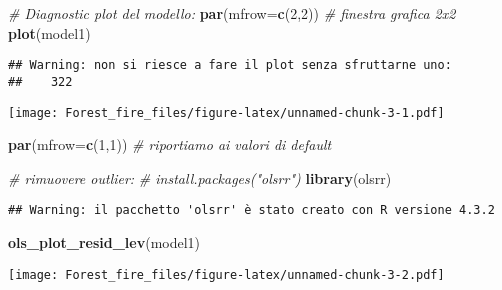 \documentclass[
]{article}
\newenvironment{Shaded}{\begin{snugshade}}{\end{snugshade}}
\newcommand{\AttributeTok}[1]{\textcolor[rgb]{0.13,0.29,0.53}{#1}}
\newcommand{\CommentTok}[1]{\textcolor[rgb]{0.56,0.35,0.01}{\textit{#1}}}
\newcommand{\DecValTok}[1]{\textcolor[rgb]{0.00,0.00,0.81}{#1}}
\newcommand{\FunctionTok}[1]{\textcolor[rgb]{0.13,0.29,0.53}{\textbf{#1}}}
\newcommand{\NormalTok}[1]{#1}
\newcommand{\OtherTok}[1]{\textcolor[rgb]{0.56,0.35,0.01}{#1}}
\newcommand{\SpecialCharTok}[1]{\textcolor[rgb]{0.81,0.36,0.00}{\textbf{#1}}}
\begin{document}
\begin{Shaded}
\begin{Highlighting}[]
\CommentTok{\# Diagnostic plot del modello:}
\FunctionTok{par}\NormalTok{(}\AttributeTok{mfrow=}\FunctionTok{c}\NormalTok{(}\DecValTok{2}\NormalTok{,}\DecValTok{2}\NormalTok{)) }\CommentTok{\# finestra grafica 2x2}
\FunctionTok{plot}\NormalTok{(model1)}
\end{Highlighting}
\end{Shaded}

\begin{verbatim}
## Warning: non si riesce a fare il plot senza sfruttarne uno:
##    322
\end{verbatim}

\texttt{[image: Forest\_fire\_files/figure-latex/unnamed-chunk-3-1.pdf]}

\begin{Shaded}
\begin{Highlighting}[]
\FunctionTok{par}\NormalTok{(}\AttributeTok{mfrow=}\FunctionTok{c}\NormalTok{(}\DecValTok{1}\NormalTok{,}\DecValTok{1}\NormalTok{)) }\CommentTok{\# riportiamo ai valori di default}

\CommentTok{\# rimuovere outlier:}
\CommentTok{\# install.packages("olsrr")}
\FunctionTok{library}\NormalTok{(olsrr)}
\end{Highlighting}
\end{Shaded}

\begin{verbatim}
## Warning: il pacchetto 'olsrr' è stato creato con R versione 4.3.2
\end{verbatim}

\begin{Shaded}
\begin{Highlighting}[]
\FunctionTok{ols\_plot\_resid\_lev}\NormalTok{(model1)}
\end{Highlighting}
\end{Shaded}

\texttt{[image: Forest\_fire\_files/figure-latex/unnamed-chunk-3-2.pdf]}

\begin{Shaded}
\end{Shaded}
\end{document}
